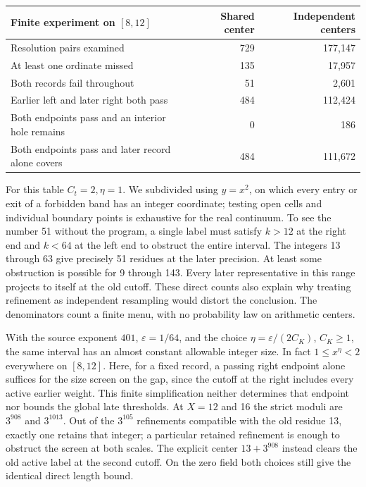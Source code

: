 \documentclass[12pt,letterpaper]{article}
\begin{document}
\begin{center}\small\begin{tabularx}{\linewidth}{@{}Yrr@{}}
\toprule
Finite experiment on \([8,12]\) & Shared center & Independent centers\\\midrule
Resolution pairs examined & 729 & 177,147\\
At least one ordinate missed & 135 & 17,957\\
Both records fail throughout & 51 & 2,601\\
Earlier left and later right both pass & 484 & 112,424\\
Both endpoints pass and an interior hole remains & 0 & 186\\
Both endpoints pass and later record alone covers & 484 & 111,672\\\bottomrule
\end{tabularx}\end{center}
For this table \(C_t=2,\eta=1\). We subdivided using \(y=x^2\), on which every entry or exit of a forbidden band has an integer coordinate; testing open cells and individual boundary points is exhaustive for the real continuum. To see the number 51 without the program, a single label must satisfy \(k>12\) at the right end and \(k<64\) at the left end to obstruct the entire interval. The integers 13 through 63 give precisely 51 residues at the later precision. At least some obstruction is possible for 9 through 143. Every later representative in this range projects to itself at the old cutoff. These direct counts also explain why treating refinement as independent resampling would distort the conclusion. The denominators count a finite menu, with no probability law on arithmetic centers.

With the source exponent \(401\), \(\varepsilon=1/64\), and the choice \(\eta=\varepsilon/(2C_K)\), \(C_K\ge1\), the same interval has an almost constant allowable integer size. In fact \(1\le x^\eta<2\) everywhere on \([8,12]\). Here, for a fixed record, a passing right endpoint alone suffices for the size screen on the gap, since the cutoff at the right includes every active earlier weight. This finite simplification neither determines that endpoint nor bounds the global late thresholds. At \(X=12\) and 16 the strict moduli are \(3^{908}\) and \(3^{1013}\). Out of the \(3^{105}\) refinements compatible with the old residue 13, exactly one retains that integer; a particular retained refinement is enough to obstruct the screen at both scales. The explicit center \(13+3^{908}\) instead clears the old active label at the second cutoff. On the zero field both choices still give the identical direct length bound.
\end{document}
